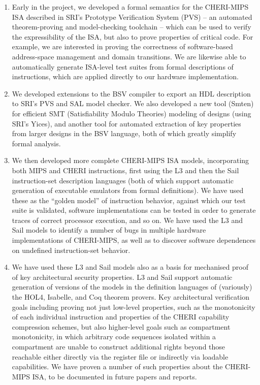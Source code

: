 \begin{enumerate}
\item Early in the project, we developed a formal semantics for the CHERI-MIPS ISA described in
  SRI's Prototype Verification System (PVS) -- an automated theorem-proving
  and model-checking toolchain -- which can be used to verify the
  expressibility of the ISA, but also to prove properties of critical code.
  For example, we are interested in proving the correctness of software-based
  address-space management and domain transitions.
  We are likewise able to automatically generate ISA-level test suites from
  formal descriptions of instructions, which are applied directly to our
  hardware implementation.

\item We developed extensions to the BSV compiler to export
  an HDL description to SRI's PVS and SAL model checker.
  We also developed a new tool (Smten)
for efficient SMT (Satisfiability Modulo Theories) modeling of designs
 (using SRI's Yices), and another tool for
  automated extraction of key properties from larger designs in the
  BSV language, both
  of which greatly simplify formal analysis.


\item We then developed more complete CHERI-MIPS ISA models,
  incorporating both
  MIPS and CHERI instructions, first using the L3 and then the Sail instruction-set description
  languages (both of which support automatic generation of executable
  emulators from formal definitions).
  We have used these as the ``golden model'' of instruction
  behavior, against which our test suite is validated, software implementations can
  be tested in order to generate traces of correct processor execution, and so
  on.
  We have used the L3 and Sail models to identify a number of bugs in multiple hardware
  implementations of CHERI-MIPS, as well as to discover software dependences
  on undefined instruction-set behavior.

\item We have used these L3 and Sail models also as a basis for
  mechanised proof of key architectural security properties.
L3 and Sail support automatic generation of versions of the models in
the definition languages of (variously) the
HOL4, Isabelle, and Coq theorem provers.
Key architectural verification goals including proving not just low-level
properties, such as the monotonicity of each individual instruction
and properties of the CHERI capability compression schemes, but also
higher-level goals such as compartment monotonicity, in which arbitrary code
sequences isolated within a compartment are unable to construct additional
rights beyond those reachable either directly via the register file or
indirectly via loadable capabilities.
We have proven a number of such properties about the CHERI-MIPS ISA, to be
documented in future papers and reports.


\end{enumerate}
